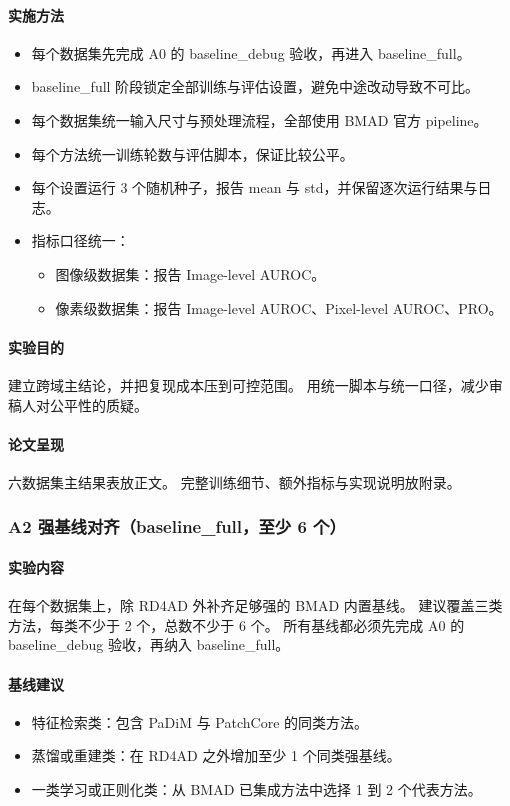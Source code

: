 \documentclass[UTF8,a4paper]{ctexart}
\begin{document}
\paragraph{实施方法}
\begin{itemize}
  \item 每个数据集先完成 A0 的 baseline\_debug 验收，再进入 baseline\_full。
  \item baseline\_full 阶段锁定全部训练与评估设置，避免中途改动导致不可比。
  \item 每个数据集统一输入尺寸与预处理流程，全部使用 BMAD 官方 pipeline。
  \item 每个方法统一训练轮数与评估脚本，保证比较公平。
  \item 每个设置运行 3 个随机种子，报告 mean 与 std，并保留逐次运行结果与日志。
  \item 指标口径统一：
  \begin{itemize}
    \item 图像级数据集：报告 Image-level AUROC。
    \item 像素级数据集：报告 Image-level AUROC、Pixel-level AUROC、PRO。
  \end{itemize}
\end{itemize}

\paragraph{实验目的}
建立跨域主结论，并把复现成本压到可控范围。
用统一脚本与统一口径，减少审稿人对公平性的质疑。

\paragraph{论文呈现}
六数据集主结果表放正文。
完整训练细节、额外指标与实现说明放附录。

\subsubsection{A2 强基线对齐（baseline\_full，至少 6 个）}

\paragraph{实验内容}
在每个数据集上，除 RD4AD 外补齐足够强的 BMAD 内置基线。
建议覆盖三类方法，每类不少于 2 个，总数不少于 6 个。
所有基线都必须先完成 A0 的 baseline\_debug 验收，再纳入 baseline\_full。

\paragraph{基线建议}
\begin{itemize}
  \item 特征检索类：包含 PaDiM 与 PatchCore 的同类方法。
  \item 蒸馏或重建类：在 RD4AD 之外增加至少 1 个同类强基线。
  \item 一类学习或正则化类：从 BMAD 已集成方法中选择 1 到 2 个代表方法。
\end{itemize}
\end{document}
